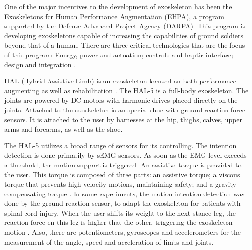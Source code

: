    One of the major incentives to the development of exoskeleton has been the Exoskeletons for Human Performance Augmentation (EHPA), a program supported by the Defense Advanced Project Agency (DARPA). This program is developing exoskeletons capable of increasing the capabilities of ground soldiers beyond that of a human. There are three critical technologies that are the focus of this program: Energy, power and actuation; controls and haptic interface; design and integration \cite{Ephraim2002822}.
   
   HAL (Hybrid Assistive Limb) is an exoskeleton focused on both performance-augmenting as well as rehabilitation \cite{Sankai2011}. The HAL-5 is a full-body exoskeleton. The joints are powered by DC motors with harmonic drives placed directly on the joints. Attached to the exoskeleton is an special shoe with ground reaction force sensors. It is attached to the user by harnesses at the hip, thighs, calves, upper arms and forearms, as well as the shoe. 
   
   The HAL-5 utilizes a broad range of sensors for its controlling. The intention detection is done primarily by sEMG sensors. As soon as the EMG level exceeds a threshold, the motion support is triggered. An assistive torque is provided to the user. This torque is composed of three parts: an assistive torque; a viscous torque that prevents high velocity motions, maintaining safety; and a gravity compensating torque \cite{kawamoto2010}. In some experiments, the motion intention detection was done by the ground reaction sensor, to adapt the exoskeleton for patients with spinal cord injury. When the user shifts its weight to the next stance leg, the reaction force on this leg is higher that the other, triggering the exoskeleton motion \cite{Tsukahara2015}. Also, there are potentiometers, gyroscopes and accelerometers for the measurement of the angle, speed and acceleration of limbs and joints.
   
